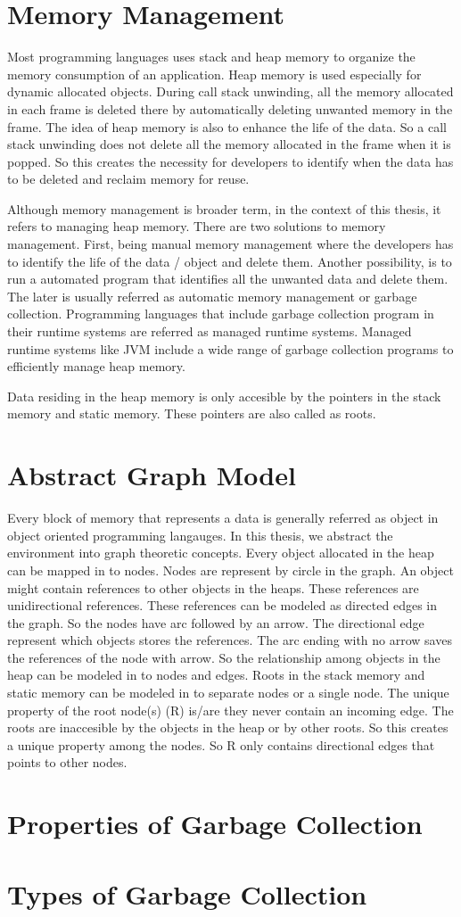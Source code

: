 \section{Memory Management}
Most programming languages uses stack and heap memory to organize the memory consumption of an application. Heap memory is used especially for dynamic allocated objects. During call stack unwinding, all the memory allocated in each frame is deleted there by automatically deleting unwanted memory in the frame. The idea of heap memory is also to enhance the life of the data. So a call stack unwinding does not delete all the memory allocated in the frame when it is popped. So this creates the necessity for developers to identify when the data has to be deleted and reclaim memory for reuse. 

Although memory management is broader term, in the context of this thesis, it refers to managing heap memory. There are two solutions to memory management. First, being manual memory management where the developers has to identify the life of the data / object and delete them. Another possibility, is to run a automated program that identifies all the unwanted data and delete them. The later is usually referred as automatic memory management or garbage collection. Programming languages that include garbage collection program in their runtime systems are referred as managed runtime systems. Managed runtime systems like JVM include a wide range of garbage collection programs to efficiently manage heap memory.

Data residing in the heap memory is only accesible by the pointers in the stack memory and static memory. These pointers are also called as roots. 

\section{Abstract Graph Model}
Every block of memory that represents a data is generally referred as object in object oriented programming langauges. In this thesis, we abstract the environment into graph theoretic concepts. 
Every object allocated in the heap can be mapped in to nodes. Nodes are represent by circle in the graph. An object might contain references to other objects in the heaps. These references are unidirectional references. These references can be modeled as directed edges in the graph. So the nodes have arc followed by an arrow. The directional edge represent which objects stores the references. The arc ending with no arrow saves the references of the node with arrow. So the relationship among objects in the heap can be modeled in to nodes and edges. Roots in the stack memory and static memory can be modeled in to separate nodes or a single node. The unique property of the root node(s) (R) is/are they never contain an incoming edge. The roots are inaccesible by the objects in the heap or by other roots. So this creates a unique property among the nodes. So R only contains directional edges that points to other nodes. 

\section{Properties of Garbage Collection}
\section{Types of Garbage Collection}